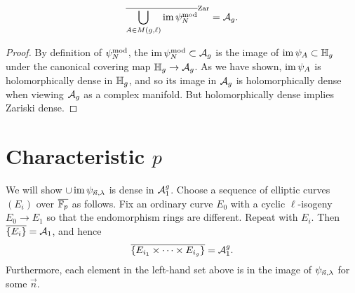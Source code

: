 \documentclass{amsart}
\begin{document}
\begin{proposition}
  \[
    \overline{\bigcup_{A \in M(g,\ell)} \operatorname{im} \psi_N^{\textrm{mod}}}^\mathrm{Zar} = \mathcal{A}_g.
  \]
\end{proposition}

\begin{proof}
  By definition of $\psi_N^{\textrm{mod}}$, the $\operatorname{im} \psi_N^{\textrm{mod}} \subset \mathcal{A}_g$ is the image of $\operatorname{im} \psi_A \subset \mathbb{H}_g$ under the canonical covering map $\mathbb{H}_g \to \mathcal{A}_g$. As we have shown, $\operatorname{im} \psi_A$ is holomorphically dense in $\mathbb{H}_g$, and so its image in $\mathcal{A}_g$ is holomorphically dense when viewing $\mathcal{A}_g$ as a complex manifold. But holomorphically dense implies Zariski dense.
\end{proof}

\section{Characteristic $p$}
\label{sec:characteristic-p}

We will show $\cup \operatorname{im} \psi_{\vec{n},\lambda}$ is dense in $\mathcal{A}_1^g$. Choose a sequence of elliptic curves $(E_i)$ over $\overline{\mathbb{F}_p}$ as follows. Fix an ordinary curve $E_0$ with a cyclic $\ell$-isogeny $E_0 \to E_1$ so that the endomorphism rings are different. Repeat with $E_i$. Then $\overline{\{E_i\}} = \mathcal{A}_1$, and hence
\[
  \overline{\{E_{i_1} \times \cdots \times E_{i_g}\}} = \mathcal{A}_1^g.
\]
Furthermore, each element in the left-hand set above is in the image of $\psi_{\vec{n},\lambda}$ for some $\vec{n}$.



\end{document}

